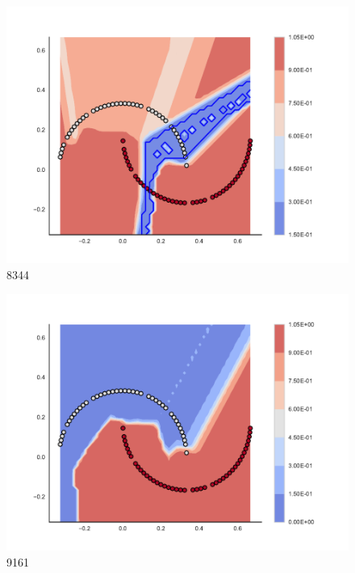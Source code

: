 \begin{subfigure}[b]{0.12\textwidth}
    \includegraphics[clip, trim=2.35cm 1.75cm 4.5cm 0cm,width=\textwidth]{img/convergence/8344.pdf}
    \caption{8344}
    \label{fig:convergence_8344}
\end{subfigure}
%
\begin{subfigure}[b]{0.12\textwidth}
    \includegraphics[clip, trim=2.35cm 1.75cm 4.5cm 0cm,width=\textwidth]{img/convergence/9161.pdf}
    \caption{9161}
    \label{fig:convergence_9161}
\end{subfigure}
%
